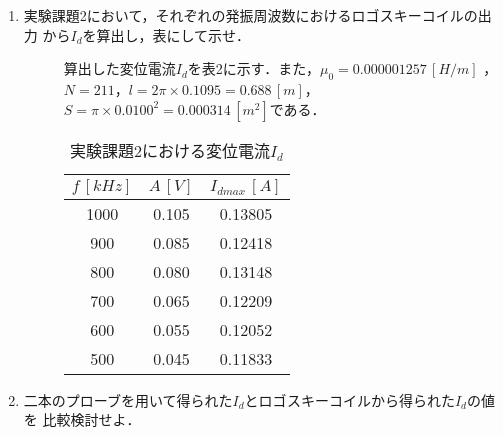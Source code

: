 \begin{enumerate}
    \item 実験課題2において，それぞれの発振周波数におけるロゴスキーコイルの出力
    から$I_d$を算出し，表にして示せ．
    \begin{description}
        \item[] 算出した変位電流$I_d$を表2に示す．また，$\mu_0=0.000001257\,\si{[H/m]}$
        ，$N=211$，$l=2\pi\times 0.1095=0.688\,[\si{m}]$，
        $S=\pi\times 0.0100^2=0.000314\,[\si{m^2}]$である．
        \begin{table}[H]
            \centering
            \caption{実験課題2における変位電流$I_d$}
            \begin{tabular}{c|c|c}
                \hline
                $f\,[\si{kHz}]$ & $A\,[\si{V}]$ & $I_{dmax}\,[\si{A}]$ \\ \hline
                1000 & 0.105 & 0.13805 \\ 
                900 & 0.085 & 0.12418 \\ 
                800 & 0.080 & 0.13148 \\ 
                700 & 0.065 & 0.12209 \\ 
                600 & 0.055 & 0.12052 \\ 
                500 & 0.045 & 0.11833 \\ \hline
            \end{tabular}
        \end{table}
    \end{description}

\newpage

    \item 二本のプローブを用いて得られた$I_d$とロゴスキーコイルから得られた$I_d$の値を
    比較検討せよ．
\end{enumerate}
